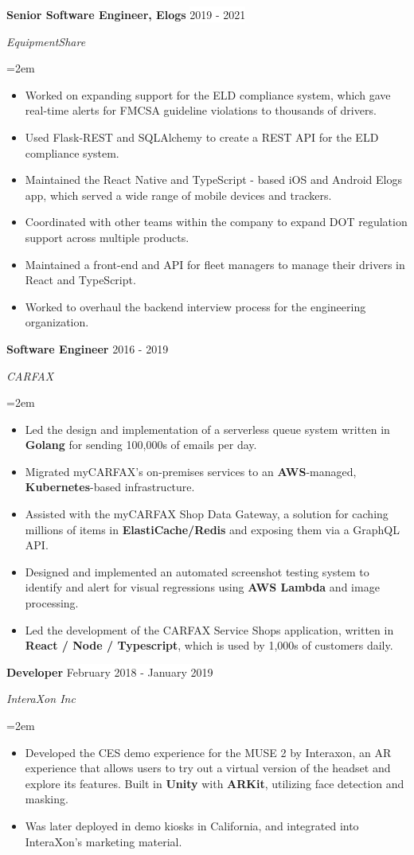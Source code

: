 \documentclass[paper=a4,fontsize=9pt]{scrartcl} %
\newcommand{\sepspace}{\vspace*{0.8em}}		%
\newcommand{\EducationEntry}[4]{
			\noindent \textbf{#1} \hfill      %
			\colorbox{Black}{%
				\parbox{6em}{%
				\hfill\color{White}#2}} \par  %
			\noindent \textit{#3} \par        %
			\noindent\hangindent=2em\hangafter=0 \small #4 %
			\normalsize \par}
\newcommand{\WorkEntry}[4]{				  %
			\noindent \textbf{#1} \hfill      %
			\colorbox{White}{\color{Black}#2} \par  %
			\noindent \textit{#3} \par              %
			\noindent\hangindent=2em\hangafter=0 \small #4 %
			\normalsize \par}
\begin{document}
	\WorkEntry{Senior Software Engineer, Elogs}{2019 - 2021}{EquipmentShare}{
		\begin{itemize}
			\item Worked on expanding support for the ELD compliance system, which gave real-time alerts for FMCSA guideline violations to thousands of drivers.
			\item Used Flask-REST and SQLAlchemy to create a REST API for the ELD compliance system.
			\item Maintained the React Native and TypeScript - based iOS and Android Elogs app, which served a wide range of mobile devices and trackers.
			\item Coordinated with other teams within the company to expand DOT regulation support across multiple products.
			\item Maintained a front-end and API for fleet managers to manage their drivers in React and TypeScript.
			\item Worked to overhaul the backend interview process for the engineering organization.
		\end{itemize}
	}
	\sepspace
	
	\WorkEntry{Software Engineer}{2016 - 2019}{CARFAX}{
		\begin{itemize}
			\item Led the design and implementation of a serverless queue system written in \textbf{Golang} for sending 100,000s of emails per day.
			\item Migrated myCARFAX's on-premises services to an \textbf{AWS}-managed, \textbf{Kubernetes}-based infrastructure.
			\item Assisted with the myCARFAX Shop Data Gateway, a solution for caching millions of items in \textbf{ElastiCache/Redis} and exposing them via a GraphQL API.
			\item Designed and implemented an automated screenshot testing system to identify and alert for visual regressions using \textbf{AWS Lambda} and image processing.
			\item Led the development of the CARFAX Service Shops application, written in \textbf{React / Node / Typescript}, which is used by 1,000s of customers daily.
		\end{itemize}
	}
	\sepspace
	
	\WorkEntry{Developer}{February 2018 - January 2019}{InteraXon Inc}{
		\begin{itemize}
			\item Developed the CES demo experience for the MUSE 2 by Interaxon, an AR experience that allows users to try out a virtual version of the headset and explore its features. Built in \textbf{Unity} with \textbf{ARKit}, utilizing face detection and masking.
			\item Was later deployed in demo kiosks in California, and integrated into InteraXon's marketing material.
		\end{itemize}
	}
	\sepspace
\end{document}
